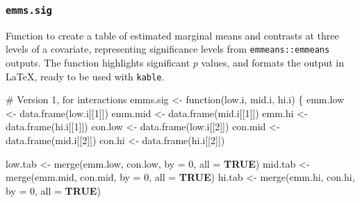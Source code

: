 \documentclass[
  bookmarksnumbered]{article}
\newenvironment{Shaded}{\begin{snugshade}}{\end{snugshade}}
\newcommand{\AttributeTok}[1]{\textcolor[rgb]{0.80,0.80,0.80}{#1}}
\newcommand{\CommentTok}[1]{\textcolor[rgb]{0.50,0.62,0.50}{#1}}
\newcommand{\ConstantTok}[1]{\textcolor[rgb]{0.86,0.64,0.64}{\textbf{#1}}}
\newcommand{\ControlFlowTok}[1]{\textcolor[rgb]{0.94,0.87,0.69}{#1}}
\newcommand{\DecValTok}[1]{\textcolor[rgb]{0.86,0.86,0.80}{#1}}
\newcommand{\FunctionTok}[1]{\textcolor[rgb]{0.94,0.94,0.56}{#1}}
\newcommand{\NormalTok}[1]{\textcolor[rgb]{0.80,0.80,0.80}{#1}}
\newcommand{\OtherTok}[1]{\textcolor[rgb]{0.94,0.94,0.56}{#1}}
\begin{document}
\hypertarget{emms.sig}{%
\subsubsection{\texorpdfstring{\texttt{emms.sig}}{emms.sig}}\label{emms.sig}}

Function to create a table of estimated marginal means and contrasts at three levels of a covariate, representing significance levels from \texttt{emmeans::emmeans} outputs. The function highlights significant \(p\) values, and formats the output in \LaTeX, ready to be used with \texttt{kable}.

\begin{Shaded}
\begin{Highlighting}[]
\CommentTok{\# Version 1, for interactions}
\NormalTok{emms.sig }\OtherTok{\textless{}{-}} \ControlFlowTok{function}\NormalTok{(low.i, mid.i, hi.i) \{}
\NormalTok{  emm.low }\OtherTok{\textless{}{-}} \FunctionTok{data.frame}\NormalTok{(low.i[[}\DecValTok{1}\NormalTok{]])}
\NormalTok{  emm.mid }\OtherTok{\textless{}{-}} \FunctionTok{data.frame}\NormalTok{(mid.i[[}\DecValTok{1}\NormalTok{]])}
\NormalTok{  emm.hi }\OtherTok{\textless{}{-}} \FunctionTok{data.frame}\NormalTok{(hi.i[[}\DecValTok{1}\NormalTok{]])}
\NormalTok{  con.low }\OtherTok{\textless{}{-}} \FunctionTok{data.frame}\NormalTok{(low.i[[}\DecValTok{2}\NormalTok{]])}
\NormalTok{  con.mid }\OtherTok{\textless{}{-}} \FunctionTok{data.frame}\NormalTok{(mid.i[[}\DecValTok{2}\NormalTok{]])}
\NormalTok{  con.hi }\OtherTok{\textless{}{-}} \FunctionTok{data.frame}\NormalTok{(hi.i[[}\DecValTok{2}\NormalTok{]]) }
  
\NormalTok{  low.tab }\OtherTok{\textless{}{-}} \FunctionTok{merge}\NormalTok{(emm.low, con.low, }\AttributeTok{by =} \DecValTok{0}\NormalTok{, }\AttributeTok{all =} \ConstantTok{TRUE}\NormalTok{)}
\NormalTok{  mid.tab }\OtherTok{\textless{}{-}} \FunctionTok{merge}\NormalTok{(emm.mid, con.mid, }\AttributeTok{by =} \DecValTok{0}\NormalTok{, }\AttributeTok{all =} \ConstantTok{TRUE}\NormalTok{)}
\NormalTok{  hi.tab }\OtherTok{\textless{}{-}} \FunctionTok{merge}\NormalTok{(emm.hi, con.hi, }\AttributeTok{by =} \DecValTok{0}\NormalTok{, }\AttributeTok{all =} \ConstantTok{TRUE}\NormalTok{)}
  

\end{Highlighting}
\end{Shaded}
\end{document}
